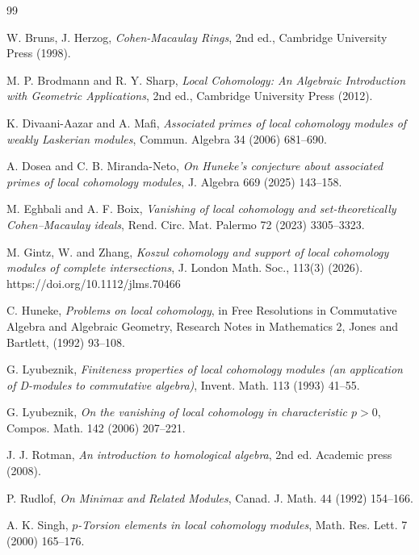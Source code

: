 \documentclass[12pt,twoside, final]{amsart}
\numberwithin{equation}{section}
\theoremstyle{definition}
\begin{document}
\begin{thebibliography}{99}

     W. Bruns, J. Herzog, {\em Cohen-Macaulay Rings}, 2nd ed., Cambridge University Press (1998).

M. P. Brodmann and R. Y. Sharp,
\emph{Local Cohomology: An Algebraic Introduction with Geometric Applications},
2nd ed., Cambridge University Press (2012).

K. Divaani-Aazar and A. Mafi,
{\em Associated primes of local cohomology modules of weakly Laskerian modules},
 Commun. Algebra  34 (2006)  681--690.

A. Dosea and C. B. Miranda-Neto,
{\em On Huneke's conjecture about associated primes of local cohomology modules},
 J. Algebra  669 (2025)  143--158.

M. Eghbali and A. F. Boix,
{\em Vanishing of local cohomology and set-theoretically Cohen--Macaulay ideals},
 Rend. Circ. Mat. Palermo  72 (2023)  3305--3323.

M. Gintz, W. and Zhang, {\em Koszul cohomology and support of local cohomology modules of complete intersections}, J. London Math. Soc., 113(3) (2026). https://doi.org/10.1112/jlms.70466

C. Huneke,
{\em Problems on local cohomology},
in  Free Resolutions in Commutative Algebra and Algebraic Geometry,
Research Notes in Mathematics 2, Jones and Bartlett, (1992) 93--108.

G. Lyubeznik,
{\em Finiteness properties of local cohomology modules
(an application of D-modules to commutative algebra)},
 Invent. Math.  113 (1993) 41--55.

G. Lyubeznik,
{\em On the vanishing of local cohomology in characteristic $p>0$},
Compos. Math.  142 (2006)  207--221.


J. J. Rotman, {\em An introduction to homological algebra}, 2nd ed. Academic press (2008).


P. Rudlof,
{\em On Minimax and Related Modules},
 Canad. J. Math.  44 (1992) 154--166.

A. K. Singh,
{\em $p$-Torsion elements in local cohomology modules},
 Math. Res. Lett.  7 (2000) 165--176.

\end{thebibliography}
\end{document}
